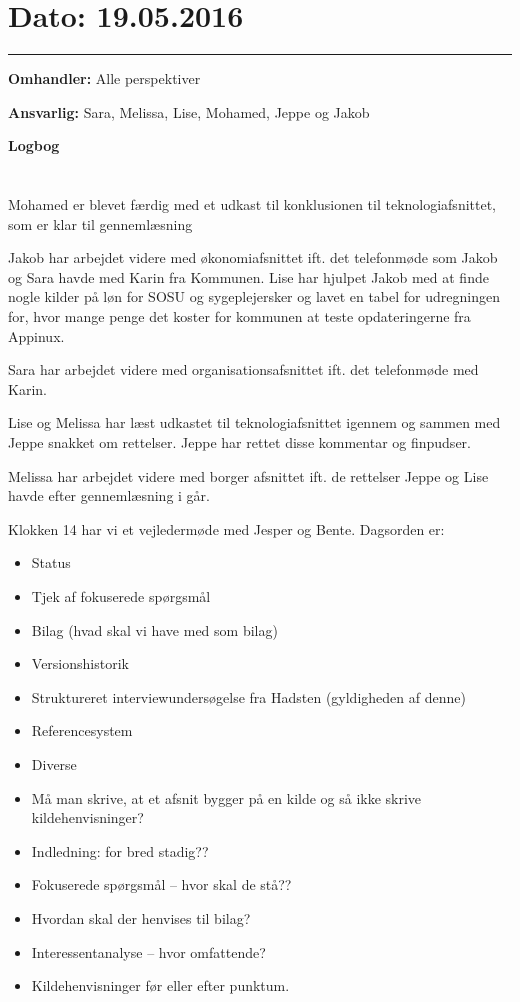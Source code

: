 

\section{Dato: 19.05.2016}
\hrule

\textbf{Omhandler:} Alle perspektiver

\textbf{Ansvarlig:} Sara, Melissa, Lise, Mohamed, Jeppe og Jakob

\textbf{Logbog}
\\
\\ \\
Mohamed er blevet færdig med et udkast til konklusionen til teknologiafsnittet, som er klar til gennemlæsning

Jakob har arbejdet videre med økonomiafsnittet ift. det telefonmøde som Jakob og Sara havde med Karin fra Kommunen. Lise har hjulpet Jakob med at finde nogle kilder på løn for SOSU og sygeplejersker og lavet en tabel for udregningen for, hvor mange penge det koster for kommunen at teste opdateringerne fra Appinux. 

Sara har arbejdet videre med organisationsafsnittet ift. det telefonmøde med Karin. 

Lise og Melissa har læst udkastet til teknologiafsnittet igennem og sammen med Jeppe snakket om rettelser. Jeppe har rettet disse kommentar og finpudser. 

Melissa har arbejdet videre med borger afsnittet ift. de rettelser Jeppe og Lise havde efter gennemlæsning i går. 

Klokken 14 har vi et vejledermøde med Jesper og Bente. 
Dagsorden er: 
\begin{itemize}
	\item Status 
	\item Tjek af fokuserede spørgsmål 
	\item Bilag (hvad skal vi have med som bilag)
	\item Versionshistorik 
	\item Struktureret interviewundersøgelse fra Hadsten (gyldigheden af denne)
	\item Referencesystem
	\item Diverse
	\item Må man skrive, at et afsnit bygger på en kilde og så ikke skrive kildehenvisninger?
	\item Indledning: for bred stadig?? 
	\item Fokuserede spørgsmål – hvor skal de stå??
	\item Hvordan skal der henvises til bilag?
	\item Interessentanalyse – hvor omfattende? 
	\item Kildehenvisninger før eller efter punktum.
\end{itemize}

 



